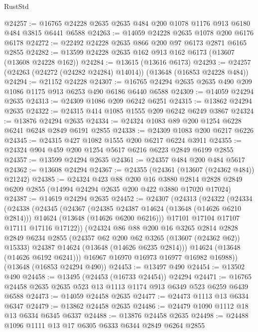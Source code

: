\begin{lexlean}{RustStd}
\begin{coremodule}
@24257 := @16765 @24228 @2635 @2635 @484 @200 @1078 @1176 @913 @6180 @484 @3815 @6441 @6588
@24263 := @14059 @24228 @2635 @1078 @200 @6176 @6178
@24272 := @22492 @24228 @2635 @866 @200 @97 @6173 @2871 @6165 @2855
@24282 := @13599 @24228 @2635 @162 @913 @162 @6173 (@13607 (@13608 @24228 @162))
@24284 := @13615 (@13616 @6173)
@24293 := @24257 (@24263 (@24272 (@24282 @24284) @14014)) (@13648 (@16853 @24228 @484))
@24294 := @21152 @24228
@24307 := @16765 @24294 @2635 @2635 @490 @209 @1086 @1175 @913 @6253 @490 @6186 @6440 @6588
@24309 := @14059 @24294 @2635
@24313 := @24309 @1086 @209 @6242 @6251
@24315 := @13862 @24294 @2635
@24322 := @24315 @414 @1085 @1555 @209 @6242 @6249 @3867
@24324 := @13876 @24294 @2635
@24334 := @24324 @1083 @89 @200 @1254 @6228 @6241 @6248 @2849 @6191 @2855
@24338 := @24309 @1083 @200 @6217 @6226
@24345 := @24315 @427 @1082 @1555 @200 @6217 @6224 @3911
@24355 := @24324 @904 @459 @200 @1254 @5617 @6216 @6223 @2849 @6199 @2855
@24357 := @13599 @24294 @2635
@24361 := @24357 @484 @200 @484 @5617
@24362 := @13608 @24294
@24367 := @24355 (@24361 (@13607 (@24362 @484)) @21242)
@24385 := @24324
    @423
    @88
    @200
    @16
    @3880
    @2814
    @2828
    @2849
    @6209
    @2855
    (@14994 @24294 @2635 @200 @422 @3880 @17020 @17024)
@24387 := @14619 @24294 @2635
@24452 := @24307
    (@24313
      (@24322
        (@24334
          (@24338
            (@24345
              (@24367
                (@24385 @24387 @14624 (@13648 (@14626 @6210 @2814)))
                @14624
                (@13648 (@14626 @6200 @6216)))
              @17101
              @17104
              @17107
              @17111
              @17116
              @17122))
          (@24324
            @86
            @88
            @200
            @16
            @3265
            @2814
            @2828
            @2849
            @6234
            @2855
            (@24357 @62 @200 @62 @3265 (@13607 (@24362 @62)) @15333)
            @24387
            @14624
            (@13648 (@14626 @6235 @2814)))
          @14624
          (@13648 (@14626 @6192 @6241)))
        @16967
        @16970
        @16973
        @16977
        @16982
        @16988))
    (@13648 (@16853 @24294 @490))
@24453 := @13497 @490
@24454 := @13502 @490
@24458 := @13495 (@24453 (@16733 @24454)) @24294
@24471 := @16765 @24458 @2635 @2635 @523 @13 @1113 @1174 @913 @6349 @523 @6259 @6439 @6588
@24473 := @14059 @24458 @2635
@24477 := @24473 @1113 @13 @6334 @6347
@24479 := @13862 @24458 @2635
@24486 := @24479 @1090 @1112 @18 @13 @6334 @6345 @6337
@24488 := @13876 @24458 @2635
@24498 := @24488 @1096 @1111 @13 @17 @6305 @6333 @6344 @2849 @6264 @2855

\end{coremodule}
\end{lexlean}

